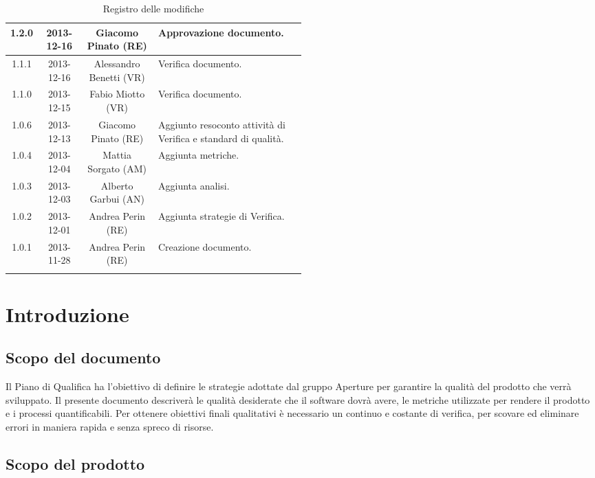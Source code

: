 \begin{center}
\begin{longtable}{|c|c|c|p{0.5\linewidth}|}
\midrule
1.2.0 & 2013-12-16 & Giacomo Pinato (RE) & Approvazione documento.\\
\midrule
1.1.1 & 2013-12-16 & Alessandro Benetti (VR) & Verifica documento.\\
\midrule
1.1.0 & 2013-12-15 & Fabio Miotto (VR) & Verifica documento.\\
\midrule
1.0.6 & 2013-12-13 & Giacomo Pinato (RE) & Aggiunto resoconto attività di Verifica e standard di qualità.\\
\midrule
1.0.4 & 2013-12-04 & Mattia Sorgato (AM) & Aggiunta metriche.\\
\midrule
1.0.3 & 2013-12-03 & Alberto Garbui (AN) & Aggiunta analisi.\\
\midrule
1.0.2 & 2013-12-01 & Andrea Perin (RE) & Aggiunta strategie di Verifica.\\
\midrule
1.0.1 & 2013-11-28 & Andrea Perin (RE) & Creazione documento.\\

\bottomrule
\caption{Registro delle modifiche}
\label{tab:changelog}
\end{longtable}
\end{center}

\newpage
\tableofcontents

\newpage
\listoftables
\listoffigures

\newpage
\section{Introduzione}%
\label{1.0}
\subsection{Scopo del documento}%
\label{1.1}
Il Piano di Qualifica ha l'obiettivo di definire le strategie adottate dal gruppo Aperture  per garantire la qualità del prodotto che verrà sviluppato.
Il presente documento descriverà le qualità desiderate che il software dovrà avere, le metriche utilizzate per rendere il prodotto e i processi quantificabili. Per ottenere obiettivi finali qualitativi è necessario un continuo e costante  di verifica, per scovare ed eliminare errori in maniera rapida e senza spreco di risorse.

\subsection{Scopo del prodotto}%
\label{1.2}
\Prodotto{}

